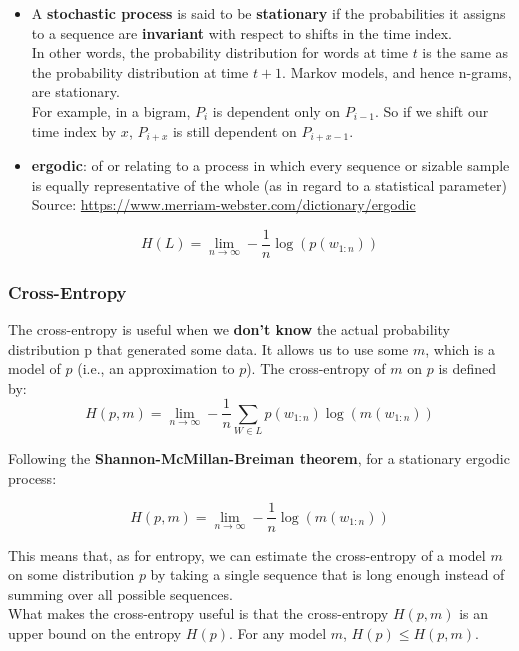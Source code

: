 \begin{itemize}
    \item A \textbf{stochastic process} is said to be \textbf{stationary} if the probabilities it assigns to a sequence are \textbf{invariant} with respect to shifts in the time index.\\ In other words, the probability distribution for words at time $t$ is the same as the probability distribution at time $t + 1$. Markov models, and hence n-grams, are stationary.\\ For example, in a bigram, $P_i$ is dependent only on $P_{i-1}$. So if we shift our time index by $x$, $P_{i+x}$ is still dependent on $P_{i+x-1}$.
    \item \textbf{ergodic}: of or relating to a process in which every sequence or sizable sample is equally representative of the whole (as in regard to a statistical parameter)\\
    Source: \href{https://www.merriam-webster.com/dictionary/ergodic}{https://www.merriam-webster.com/dictionary/ergodic}
\end{itemize}

\[
    H(L) = \lim_{n \rightarrow \infty} -\displaystyle\frac{1}{n} \log(p(w_{1:n}))
\]

\subsubsection{Cross-Entropy}
The cross-entropy is useful when we \textbf{don’t know} the actual probability distribution p that generated some data. It allows us to use some $m$, which is a model of $p$ (i.e., an approximation to $p$). The
cross-entropy of $m$ on $p$ is defined by:
\[
    H(p,m) = \lim_{n \rightarrow \infty} - \displaystyle\frac{1}{n}\sum_{W\in L} p(w_{1:n})\log(m(w_{1:n}))
\]

Following the \textbf{Shannon-McMillan-Breiman theorem}, for a stationary ergodic process:

\[
    H(p,m) = \lim_{n \rightarrow \infty} - \displaystyle\frac{1}{n}\log(m(w_{1:n}))
\]

This means that, as for entropy, we can estimate the cross-entropy of a model $m$ on some distribution $p$ by taking a single sequence that is long enough instead of summing over all possible sequences.\\

What makes the cross-entropy useful is that the cross-entropy $H(p,m)$ is an upper bound on the entropy $H(p)$. For any model $m$, \(H(p) \leq H(p,m)\).



